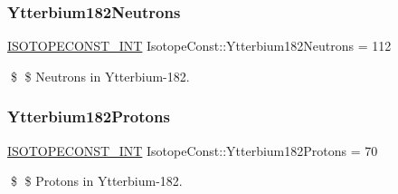 \subsubsection{\texorpdfstring{Ytterbium182\+Neutrons}{Ytterbium182Neutrons}}
{\footnotesize\ttfamily \mbox{\hyperlink{group___isotope_const-_macros_ga5f18360b3e99483a35c32d789e62621c}{I\+S\+O\+T\+O\+P\+E\+C\+O\+N\+S\+T\+\_\+\+I\+NT}} Isotope\+Const\+::\+Ytterbium182\+Neutrons = 112}

\$ \$ Neutrons in Ytterbium-\/182. \mbox{\label{group___isotope_const-_ytterbium-_yb182_ga1b5f9933e942f8bd7df63d4b0b1b737f}} 
\subsubsection{\texorpdfstring{Ytterbium182\+Protons}{Ytterbium182Protons}}
{\footnotesize\ttfamily \mbox{\hyperlink{group___isotope_const-_macros_ga5f18360b3e99483a35c32d789e62621c}{I\+S\+O\+T\+O\+P\+E\+C\+O\+N\+S\+T\+\_\+\+I\+NT}} Isotope\+Const\+::\+Ytterbium182\+Protons = 70}

\$ \$ Protons in Ytterbium-\/182. 
